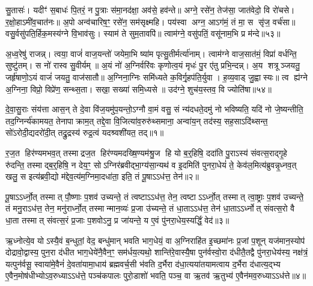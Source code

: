 सु॒तासः॑। यदीꣳ॑ स॒बाधः॑ पि॒तरं॒ न पु॒त्राः स॑मा॒नद॑क्षा॒ अव॑से॒ हव॑न्ते॥ अग्ने॒ रसे॑न॒ तेज॑सा॒ जात॑वेदो॒ वि रो॑चसे। र॒क्षो॒हाऽमी॑व॒चात॑नः॥ अ॒पो अन्व॑चारिष॒ꣳ॒ रसे॑न॒ सम॑सृक्ष्महि। पय॑स्वा अग्न॒ आऽग॑मं॒ तं मा॒ स सृ॑ज॒ वर्च॑सा॥ वसु॒र्वसु॑पति॒र्\mbox{}हिक॒मस्य॑ग्ने वि॒भाव॑सुः। स्याम॑ ते सुम॒तावपि॑॥ त्वाम॑ग्ने॒ वसु॑पतिं॒ वसू॑नाम॒भि प्र म॑न्दे॥५३॥

अ॒ध्व॒रेषु॑ राजन्न्। त्वया॒ वाजं॑ वाज॒यन्तो॑ जयेमा॒भि ष्या॑म पृत्सु॒तीर्मर्त्या॑नाम्। त्वाम॑ग्ने वाज॒सात॑मं॒ विप्रा॑ वर्धन्ति॒ सुष्टु॑तम्। स नो॑ रास्व सु॒वीर्यम्॥ अ॒यं नो॑ अ॒ग्निर्वरि॑वः कृणोत्व॒यं मृधः॑ पु॒र ए॑तु प्रभि॒न्दन्न्। अ॒य शत्रूञ्जयतु॒ जर्\mbox{}हृ॑षाणो॒ऽयं वाजं॑ जयतु॒ वाज॑सातौ॥ अ॒ग्निना॒ग्निः समि॑ध्यते क॒विर्गृ॒हप॑ति॒र्युवा। ह॒व्य॒वाड् जु॒ह्वास्यः॥ त्व ह्य॑ग्ने अ॒ग्निना॒ विप्रो॒ विप्रे॑ण॒ सन्थ्स॒ता। सखा॒ सख्या॑ समि॒ध्यसे॥ उद॑ग्ने॒ शुच॑य॒स्तव॒ वि ज्योति॑षा॥५४॥

{\anuvakamend[{म॒घवा॑नं मन्दे॒ ह्य॑ग्ने॒ चतु॑र्दश च॥46॥}]}

\setcounter{anuvakam}{0}
दे॒वा॒सु॒राः संय॑त्ता आस॒न् ते दे॒वा वि॑ज॒यमु॑प॒यन्तो॒ऽग्नौ वा॒मं वसु॒ सं न्य॑दधते॒दमु॑ नो भविष्यति॒ यदि॑ नो जे॒ष्यन्तीति॒ तद॒ग्निर्न्य॑कामयत॒ तेनापाक्राम॒त् तद्दे॒वा वि॒जित्या॑व॒रुरु॑थ्समाना॒ अन्वा॑य॒न् तद॑स्य॒ सह॒साऽदि॑थ्सन्त॒ सो॑ऽरोदी॒द्यदरो॑दी॒त् तद्रु॒द्रस्य॑ रुद्र॒त्वं यदश्र्वशी॑यत॒ तद्॥१॥

र॒ज॒त हिर॑ण्यमभव॒त् तस्माद्रज॒त हिर॑ण्यमदख्षि॒ण्यम॑श्रु॒ज हि यो ब॒र्॒\mbox{}हिषि॒ ददा॑ति पु॒राऽस्य॑ संवत्स॒राद्गृ॒हे रु॑दन्ति॒ तस्माद्ब॒र्॒\mbox{}हिषि॒ न देय॒ꣳ॒ सोऽग्निर॑ब्रवीद्भा॒ग्य॑सा॒न्यथ॑ व इ॒दमिति॑ पुनरा॒धेयं॑ ते॒ केव॑ल॒मित्य॑ब्रुवन्नृ॒ध्नव॒त् खलु॒ स इत्य॑ब्रवी॒द्यो म॑द्देव॒त्य॑म॒ग्निमा॒दधा॑ता॒ इति॒ तं पू॒षाऽऽध॑त्त॒ तेन॑॥२॥

पू॒षाऽऽर्ध्नो॒त् तस्मात् पौ॒ष्णाः प॒शव॑ उच्यन्ते॒ तं त्वष्टाऽऽध॑त्त॒ तेन॒ त्वष्टाऽऽर्ध्नो॒त् तस्मात् त्वा॒ष्ट्राः प॒शव॑ उच्यन्ते॒ तं मनु॒राऽध॑त्त॒ तेन॒ मनु॑रार्ध्नो॒त् तस्मान्मान॒व्यः॑ प्र॒जा उ॑च्यन्ते॒ तं धा॒ताऽऽध॑त्त॒ तेन॑ धा॒ताऽऽर्ध्नोत् संवत्स॒रो वै धा॒ता तस्मात् संवत्स॒रं प्र॒जाः प॒शवोऽनु॒ प्र जा॑यन्ते॒ य ए॒वं पु॑नरा॒धेय॒स्यर्द्धिं॒ वेद॑॥३॥

ऋ॒ध्नोत्ये॒व योऽस्यै॒वं ब॒न्धुतां॒ वेद॒ बन्धु॑मान् भवति भाग॒धेयं॒ वा अ॒ग्निराहि॑त इ॒च्छमा॑नः प्र॒जां प॒शून् यज॑मान॒स्योप॑ दोद्रावो॒द्वास्य॒ पुन॒रा द॑धीत भाग॒धेये॑नै॒वैन॒ꣳ॒ सम॑र्धय॒त्यथो॒ शान्ति॑रे॒वास्यै॒षा पुन॑र्वस्वो॒रा द॑धीतै॒तद्वै पु॑नरा॒धेय॑स्य॒ नक्ष॑त्रं॒ यत्पुन॑र्वसू॒ स्वाया॑मे॒वैनं॑ दे॒वता॑यामा॒धाय॑ ब्रह्मवर्च॒सी भ॑वति द॒र्भैरा द॑धा॒त्यया॑तयामत्वाय द॒र्भैरा द॑धात्य॒द्भ्य ए॒वैन॒मोष॑धीभ्योऽव॒रुध्याऽऽध॑त्ते॒ पञ्च॑कपालः पुरो॒डाशो॑ भवति॒ पञ्च॒ वा ऋ॒तव॑ ऋ॒तुभ्य॑ ए॒वैन॑मव॒रुध्याऽऽध॑त्ते॥४॥

